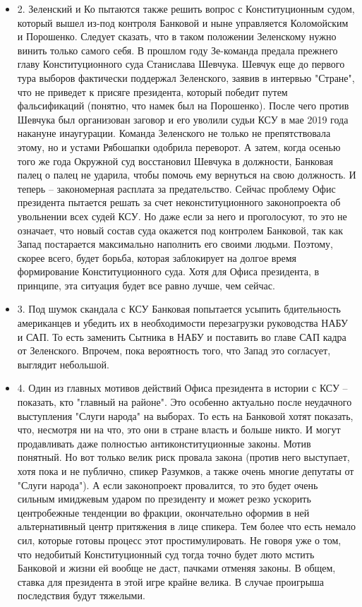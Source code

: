 \begin{itemize}
\item 2. Зеленский и Ко пытаются также решить вопрос с Конституционным судом,
				который вышел из-под контроля Банковой и ныне управляется Коломойским и
				Порошенко.  Следует сказать, что в таком положении Зеленскому нужно
				винить только самого себя. В прошлом году Зе-команда предала прежнего
				главу Конституционного суда Станислава Шевчука. Шевчук еще до первого
				тура выборов фактически поддержал Зеленского, заявив в интервью
				"Стране", что не приведет к присяге президента, который победит путем
				фальсификаций (понятно, что намек был на Порошенко).  После чего против
				Шевчука был организован заговор и его уволили судьи КСУ в мае 2019 года
				накануне инаугурации. Команда Зеленского не только не препятствовала
				этому, но и устами Рябошапки одобрила переворот. А затем, когда осенью
				того же года Окружной суд восстановил Шевчука в должности, Банковая
				палец о палец не ударила, чтобы помочь ему вернуться на свою должность.
				И теперь – закономерная расплата за предательство. Сейчас проблему Офис
				президента пытается решать за счет неконституционного законопроекта об
				увольнении всех судей КСУ. Но даже если за него и проголосуют, то это
				не означает, что новый состав суда окажется под контролем Банковой, так
				как Запад постарается максимально наполнить его своими людьми. Поэтому,
				скорее всего, будет борьба, которая заблокирует на долгое время
				формирование Конституционного суда. Хотя для Офиса президента, в
				принципе, эта ситуация будет все равно лучше, чем сейчас.

\item 3. Под шумок скандала с КСУ Банковая попытается усыпить бдительность
				американцев и убедить их в необходимости перезагрузки руководства НАБУ
				и САП.  То есть заменить Сытника в НАБУ и поставить во главе САП кадра
				от Зеленского.  Впрочем, пока вероятность того, что Запад это
				согласует, выглядит небольшой.

\item 4. Один из главных мотивов действий Офиса президента в истории с КСУ –
				показать, кто "главный на районе". Это особенно актуально после
				неудачного выступления "Слуги народа" на выборах. То есть на Банковой
				хотят показать, что, несмотря ни на что, это они в стране власть и
				больше никто. И могут продавливать даже полностью антиконституционные
				законы. Мотив понятный. Но вот только велик риск провала закона (против
				него выступает, хотя пока и не публично, спикер Разумков, а также очень
				многие депутаты от "Слуги народа"). А если законопроект провалится, то
				это будет очень сильным имиджевым ударом по президенту и может резко
				ускорить центробежные тенденции во фракции, окончательно оформив в ней
				альтернативный центр притяжения в лице спикера. Тем более что есть
				немало сил, которые готовы процесс этот простимулировать. Не говоря уже
				о том, что недобитый Конституционный суд тогда точно будет люто мстить
				Банковой и жизни ей вообще не даст, пачками отменяя законы. В общем,
				ставка для президента в этой игре крайне велика. В случае проигрыша
				последствия будут тяжелыми.


\end{itemize}

